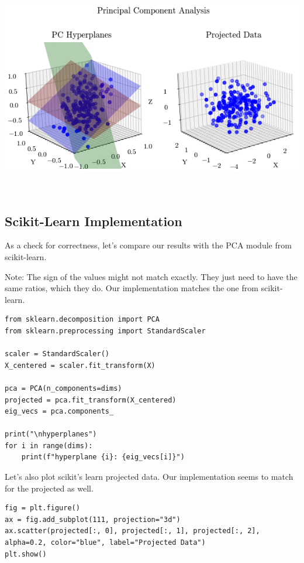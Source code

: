 \documentclass[openany]{book}
\begin{document}
    \begin{center}
    \includegraphics[width=\textwidth]{combined_files/combined_57_0.png}
    \end{center}
    { \hspace*{\fill} \\}

    \subsection{Scikit-Learn
Implementation}\label{scikit-learn-implementation}

As a check for correctness, let's compare our results with the PCA
module from scikit-learn.

Note: The sign of the values might not match exactly. They just need to
have the same ratios, which they do. Our implementation matches the one
from scikit-learn.

\begin{tcolorbox}
\tiny
\begin{verbatim}
from sklearn.decomposition import PCA
from sklearn.preprocessing import StandardScaler

scaler = StandardScaler()
X_centered = scaler.fit_transform(X)

pca = PCA(n_components=dims)
projected = pca.fit_transform(X_centered)
eig_vecs = pca.components_

print("\nhyperplanes")
for i in range(dims):
    print(f"hyperplane {i}: {eig_vecs[i]}")
\end{verbatim}
\end{tcolorbox}

    Let's also plot scikit's learn projected data. Our implementation seems
to match for the projected as well.

\begin{tcolorbox}
\tiny
\begin{verbatim}
fig = plt.figure()
ax = fig.add_subplot(111, projection="3d")
ax.scatter(projected[:, 0], projected[:, 1], projected[:, 2], alpha=0.2, color="blue", label="Projected Data")
plt.show()
\end{verbatim}
\end{tcolorbox}
\end{document}
